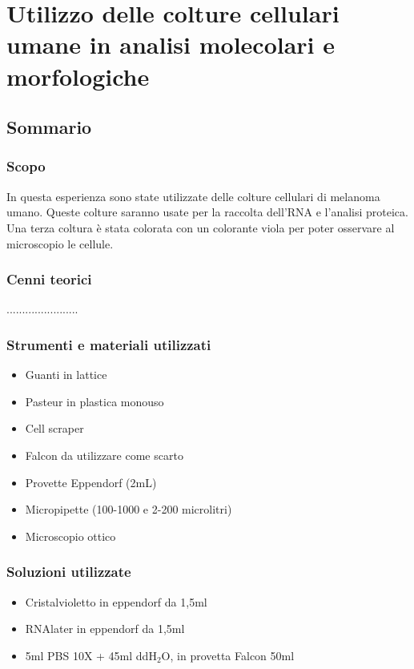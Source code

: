 \section{\LARGE{Utilizzo delle colture cellulari umane in analisi molecolari e morfologiche}}

\vspace{0.6cm}

\subsection{Sommario}

\subsubsection{Scopo}

In questa esperienza sono state utilizzate delle colture cellulari
di melanoma umano.
Queste colture saranno usate per la raccolta dell'RNA e l'analisi proteica.
Una terza coltura è stata colorata con un colorante viola per poter
osservare al microscopio le cellule.

\subsubsection{Cenni teorici}

.......................

\subsubsection{Strumenti e materiali utilizzati}

\begin{itemize}
\item Guanti in lattice
\item Pasteur in plastica monouso
\item Cell scraper
\item Falcon da utilizzare come scarto
\item Provette Eppendorf (2mL)
\item Micropipette (100-1000  e 2-200 microlitri)
\item Microscopio ottico
\end{itemize}

\subsubsection{Soluzioni utilizzate}

\begin{itemize}
\item Cristalvioletto in eppendorf da 1,5ml
\item RNAlater in eppendorf da 1,5ml
\item 5ml PBS 10X + 45ml ddH$_2$O, in provetta Falcon 50ml
\end{itemize}

